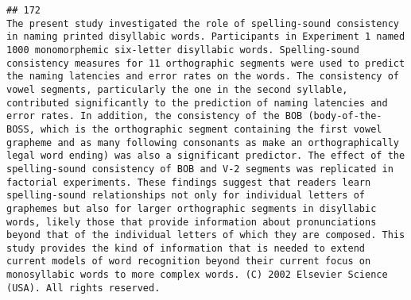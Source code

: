 \documentclass[
  english,
  man]{apa6}
\begin{document}
\begin{verbatim}
## 172                                                                                                                                                                                                                                                                                                                                                                                                                                                                                                                                                                                                                                                                                                                                                                                                                                                                                                                                                                                                                                                                                                                                                                                                                                            The present study investigated the role of spelling-sound consistency in naming printed disyllabic words. Participants in Experiment 1 named 1000 monomorphemic six-letter disyllabic words. Spelling-sound consistency measures for 11 orthographic segments were used to predict the naming latencies and error rates on the words. The consistency of vowel segments, particularly the one in the second syllable, contributed significantly to the prediction of naming latencies and error rates. In addition, the consistency of the BOB (body-of-the-BOSS, which is the orthographic segment containing the first vowel grapheme and as many following consonants as make an orthographically legal word ending) was also a significant predictor. The effect of the spelling-sound consistency of BOB and V-2 segments was replicated in factorial experiments. These findings suggest that readers learn spelling-sound relationships not only for individual letters of graphemes but also for larger orthographic segments in disyllabic words, likely those that provide information about pronunciations beyond that of the individual letters of which they are composed. This study provides the kind of information that is needed to extend current models of word recognition beyond their current focus on monosyllabic words to more complex words. (C) 2002 Elsevier Science (USA). All rights reserved.

\end{verbatim}
\end{document}
